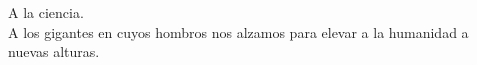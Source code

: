 \begin{flushright}
	A la ciencia.\\
	\vspace{1cm}
	A los gigantes en cuyos hombros nos alzamos para elevar a la humanidad a nuevas alturas.
\end{flushright}